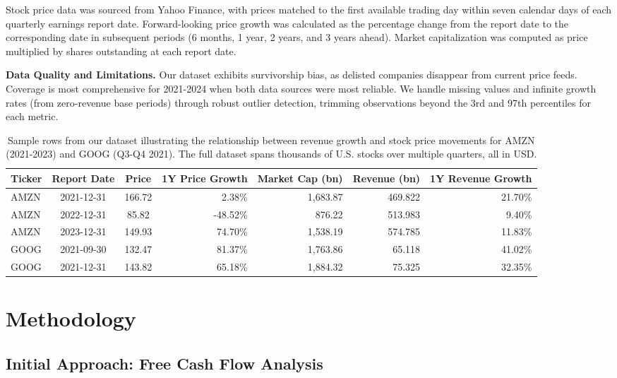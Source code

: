 \documentclass[11pt]{article}
\begin{document}
Stock price data was sourced from Yahoo Finance, with prices matched to the first available trading day within seven calendar days of each quarterly earnings report date. Forward-looking price growth was calculated as the percentage change from the report date to the corresponding date in subsequent periods (6 months, 1 year, 2 years, and 3 years ahead). Market capitalization was computed as price multiplied by shares outstanding at each report date.

\textbf{Data Quality and Limitations.} Our dataset exhibits survivorship bias, as delisted companies disappear from current price feeds. Coverage is most comprehensive for 2021-2024 when both data sources were most reliable. We handle missing values and infinite growth rates (from zero-revenue base periods) through robust outlier detection, trimming observations beyond the 3rd and 97th percentiles for each metric.  

\begin{table*}[h]
  \setlength{\tabcolsep}{4pt}
  \centering
\caption{Sample rows from our dataset illustrating the relationship between revenue growth and stock price movements for AMZN (2021-2023) and GOOG (Q3-Q4 2021). The full dataset spans thousands of U.S. stocks over multiple quarters, all in USD.}
  \label{tab:sample-data}
  \begin{tabular}{lccrrrr}
    \toprule
    Ticker & Report Date & Price & 1Y Price Growth & Market Cap (bn) & Revenue (bn) & 1Y Revenue Growth \\
    \midrule
    AMZN & 2021-12-31 & 166.72 & 2.38\%   & 1,683.87 & 469.822 &  21.70\% \\
    AMZN & 2022-12-31 &  85.82 & -48.52\% &   876.22 & 513.983 &   9.40\% \\
    AMZN & 2023-12-31 & 149.93 & 74.70\%  & 1,538.19 & 574.785 &  11.83\% \\
    \midrule
    GOOG & 2021-09-30 & 132.47 & 81.37\%  & 1,763.86 & 65.118 &   41.02\% \\
    GOOG & 2021-12-31 & 143.82 & 65.18\%  & 1,884.32 & 75.325 &   32.35\% \\
    \bottomrule
  \end{tabular}
\end{table*}

\section{Methodology}

\subsection{Initial Approach: Free Cash Flow Analysis}
\end{document}

